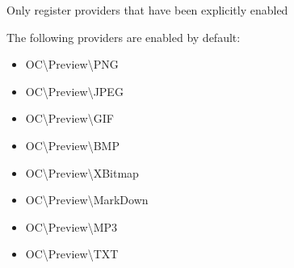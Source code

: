 \documentclass[letterpaper,10pt,english]{sphinxmanual}
\begin{document}
Only register providers that have been explicitly enabled

The following providers are enabled by default:
\begin{itemize}
\item {} 
OC\textbackslash{}Preview\textbackslash{}PNG

\item {} 
OC\textbackslash{}Preview\textbackslash{}JPEG

\item {} 
OC\textbackslash{}Preview\textbackslash{}GIF

\item {} 
OC\textbackslash{}Preview\textbackslash{}BMP

\item {} 
OC\textbackslash{}Preview\textbackslash{}XBitmap

\item {} 
OC\textbackslash{}Preview\textbackslash{}MarkDown

\item {} 
OC\textbackslash{}Preview\textbackslash{}MP3

\item {} 
OC\textbackslash{}Preview\textbackslash{}TXT

\end{itemize}
\end{document}
